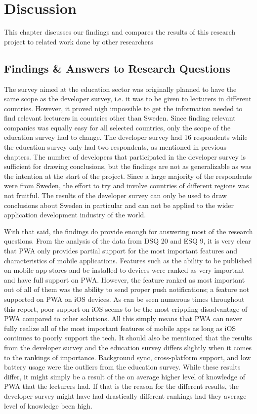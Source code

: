\documentclass[a4paper,12pt]{article}
\begin{document}
\section{Discussion}
\label{Discussion}
This chapter discusses our findings and compares the results of this research project to related work done by other researchers

\subsection{Findings \& Answers to Research Questions}
\label{Discussion_researchQuestions}
The survey aimed at the education sector was originally planned to have the same scope as the developer survey, i.e. it was to be given to lecturers in different countries. However, it proved nigh impossible to get the information needed to find relevant lecturers in countries other than Sweden. Since finding relevant companies was equally easy for all selected countries, only the scope of the education survey had to change. The developer survey had 16 respondents while the education survey only had two respondents, as mentioned in previous chapters. The number of developers that participated in the developer survey is sufficient for drawing conclusions, but the findings are not as generalizable as was the intention at the start of the project. Since a large majority of the respondents were from Sweden, the effort to try and involve countries of different regions was not fruitful. The results of the developer survey can only be used to draw conclusions about Sweden in particular and can not be applied to the wider application development industry of the world.

With that said, the findings do provide enough for answering most of the research questions. From the analysis of the data from DSQ 20 and ESQ 9, it is very clear that PWA only provides partial support for the most important features and characteristics of mobile applications. Features such as the ability to be published on mobile app stores and be installed to devices were ranked as very important and have full support on PWA. However, the feature ranked as most important out of all of them was the ability to send proper push notifications; a feature not supported on PWA on iOS devices. As can be seen numerous times throughout this report, poor support on iOS seems to be the most crippling disadvantage of PWA compared to other solutions. All this simply means that PWA can never fully realize all of the most important features of mobile apps as long as iOS continues to poorly support the tech. It should also be mentioned that the results from the developer survey and the education survey differs slightly when it comes to the rankings of importance. Background sync, cross-platform support, and low battery usage were the outliers from the education survey. While these results differ, it might simply be a result of the on average higher level of knowledge of PWA that the lecturers had. If that is the reason for the different results, the developer survey might have had drastically different rankings had they average level of knowledge been high.
\end{document}
